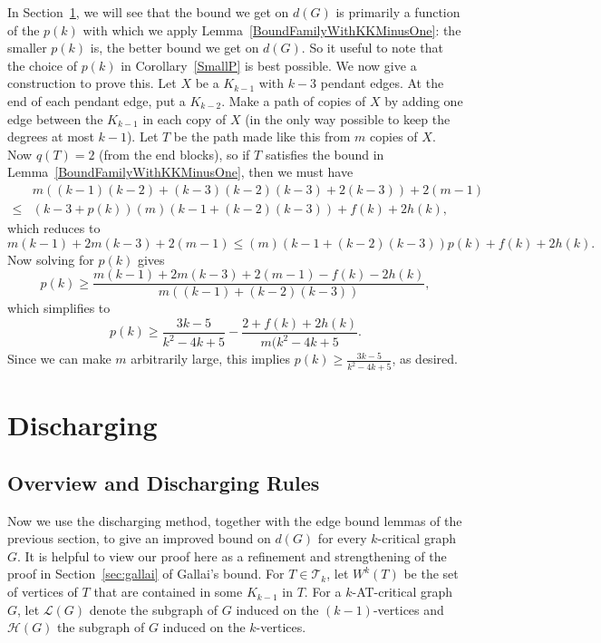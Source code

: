 \documentclass[12pt]{article}
\theoremstyle{plain}
\theoremstyle{definition}
\theoremstyle{remark}
\newcommand{\fancy}[1]{\mathcal{#1}}
\newcommand{\T}{\fancy{T}}
\renewcommand{\L}{\fancy{L}}
\newcommand{\HH}{\fancy{H}}
\begin{document}
In Section~\ref{discharging}, we will see that the bound we get on $d(G)$ is primarily a function of the $p(k)$ with which we 
apply Lemma~\ref{BoundFamilyWithKKMinusOne}: the smaller $p(k)$ is, the better bound we get on $d(G)$.  So it useful to note 
that the choice of $p(k)$ in Corollary~\ref{SmallP} is best possible.  We now give a construction to prove this.
Let $X$ be a $K_{k-1}$ with $k-3$ pendant edges.  At the end of each pendant edge, put a $K_{k-2}$.  Make a path of copies of $X$
by adding one edge between the $K_{k-1}$ in each copy of $X$ (in the only way possible to keep the degrees at most $k-1$).  Let 
$T$ be the path made like this from $m$ copies of $X$.  Now $q(T) = 2$ (from the end blocks), so if $T$ satisfies the bound in Lemma~\ref{BoundFamilyWithKKMinusOne}, then we must have
\begin{align*}
&m((k-1)(k-2) + (k-3)(k-2)(k-3) + 2(k-3)) + 2(m-1) \\
\le &(k-3 + p(k))(m)(k-1+(k-2)(k-3)) + f(k) + 2h(k),
\end{align*}
which reduces to
\[m(k-1) + 2m(k-3) + 2(m-1) \le (m)(k-1+(k-2)(k-3))p(k) + f(k) + 2h(k).\]
Now solving for $p(k)$ gives
\[p(k) \ge \frac{m(k-1)+2m(k-3)+2(m-1)-f(k)-2h(k)}{m((k-1)+(k-2)(k-3))},\] 
which simplifies to
\[p(k) \ge \frac{3k - 5}{k^2 - 4k + 5}-\frac{2+f(k)+2h(k)}{m(k^2-4k+5}.\]
Since we can make $m$ arbitrarily large, this implies $p(k)\ge \frac{3k-5}{k^2-4k+5}$, as desired.


\section{Discharging}\label{discharging}

\subsection{Overview and Discharging Rules}

Now we use the discharging method, together with the edge bound lemmas of the previous section, to give an improved bound on $d(G)$ 
for every $k$-critical graph $G$.  It is helpful to view our proof here as a refinement and strengthening of the proof in
Section~\ref{sec:gallai} of Gallai's bound.  For $T \in \T_k$, let $W^k(T)$ be the set of vertices of $T$ that are contained in 
some $K_{k-1}$ in $T$.  For a $k$-AT-critical graph $G$, let $\L(G)$ denote the subgraph of $G$ induced on the $(k-1)$-vertices and 
$\HH(G)$ the subgraph of $G$ induced on the $k$-vertices.     
\end{document}
